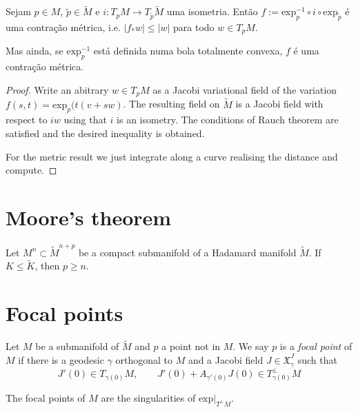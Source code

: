 \documentclass{book}
\begin{document}
\begin{proposition}
\label{proposition-contraction}
Sejam $p \in M$, $\tilde{p} \in \tilde{M}$ e
$i:T_pM \to T_{\tilde{p}}\tilde{M}$
uma isometria. Então $f:=\text{exp}^{-1}_p
\circ i \circ
\text{exp}_{\tilde{p}}$ é uma contração
métrica, i.e. $|f_*w|\leq |w|$
para todo $w \in T_pM$.

Mas ainda, se $\text{exp}_p^{-1}$ está
definida numa bola totalmente
convexa, $f$ é uma contração métrica.
\end{proposition}

\begin{proof}
Write an abitrary $w\in T_p M$ as a Jacobi
variational field of the variation
$f(s,t)=\text{exp}_p(t(v+sw)$. The resulting
field on $\tilde{M}$ is a
Jacobi field with respect to $iw$ using that
$i$ is an isometry. The conditions
of Rauch theorem are satisfied and the
desired inequality is obtained.

For the metric result we just integrate along
a curve realising the distance and
compute.
\end{proof}

\section{Moore's theorem}
\label{section-Moore}

\begin{theorem}[Moore]
\label{theorem-Moore}
Let $M^n \subset \tilde{M}^{n+p}$ be a
compact submanifold of a Hadamard
manifold $\tilde{M}$. If $K\leq \tilde{K}$,
then $p\geq n$.
\end{theorem}

\section{Focal points}
\label{section-focal points}

\begin{definition}
\label{definition-focal-point}
Let $M$ be a submanifold of $\tilde{M}$ and
$p$ a point not in $M$. We say $p$
is a {\it focal point} of $M$ if there is a
geodesic $\gamma$ orthogonal to $M$
and a Jacobi field
$J\in\mathfrak{X}^J_\gamma$ such that
$$
J'(0)\in T_{\gamma(0)}M,\qquad
J'(0)+A_{\gamma'(0)}J(0)\in
T_{\gamma(0)}^\perp M
$$
\end{definition}

\begin{proposition}
\label{proposition-focal-point-singu-norma}
The focal points of $M$ are the singularities
of $\text{exp}|_{T^\perp M}.$
\end{proposition}
\end{document}

